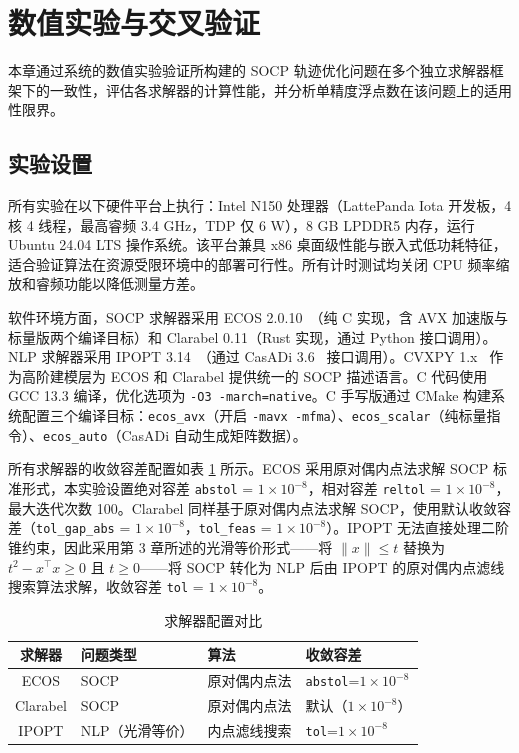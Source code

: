 \section{数值实验与交叉验证}

本章通过系统的数值实验验证所构建的 SOCP 轨迹优化问题在多个独立求解器框架下的一致性，评估各求解器的计算性能，并分析单精度浮点数在该问题上的适用性限界。

\subsection{实验设置}

所有实验在以下硬件平台上执行：Intel N150 处理器（LattePanda Iota 开发板，4 核 4 线程，最高睿频 3.4 GHz，TDP 仅 6 W），8 GB LPDDR5 内存，运行 Ubuntu 24.04 LTS 操作系统。该平台兼具 x86 桌面级性能与嵌入式低功耗特征，适合验证算法在资源受限环境中的部署可行性。所有计时测试均关闭 CPU 频率缩放和睿频功能以降低测量方差。

软件环境方面，SOCP 求解器采用 ECOS 2.0.10~\cite{domahidi2013ecos}（纯 C 实现，含 AVX 加速版与标量版两个编译目标）和 Clarabel 0.11（Rust 实现，通过 Python 接口调用）。NLP 求解器采用 IPOPT 3.14~\cite{wachter2006implementation}（通过 CasADi 3.6~\cite{andersson2019casadi} 接口调用）。CVXPY 1.x~\cite{diamond2016cvxpy} 作为高阶建模层为 ECOS 和 Clarabel 提供统一的 SOCP 描述语言。C 代码使用 GCC 13.3 编译，优化选项为 \texttt{-O3 -march=native}。C 手写版通过 CMake 构建系统配置三个编译目标：\texttt{ecos\_avx}（开启 \texttt{-mavx -mfma}）、\texttt{ecos\_scalar}（纯标量指令）、\texttt{ecos\_auto}（CasADi 自动生成矩阵数据）。

所有求解器的收敛容差配置如表 \ref{tab:solver_config} 所示。ECOS 采用原对偶内点法求解 SOCP 标准形式，本实验设置绝对容差 \texttt{abstol} = $1\times10^{-8}$，相对容差 \texttt{reltol} = $1\times10^{-8}$，最大迭代次数 100。Clarabel 同样基于原对偶内点法求解 SOCP，使用默认收敛容差（\texttt{tol\_gap\_abs} = $1\times10^{-8}$，\texttt{tol\_feas} = $1\times10^{-8}$）。IPOPT 无法直接处理二阶锥约束，因此采用第 3 章所述的光滑等价形式——将 $\|x\|\leq t$ 替换为 $t^2 - x^\top x \geq 0$ 且 $t \geq 0$——将 SOCP 转化为 NLP 后由 IPOPT 的原对偶内点滤线搜索算法求解，收敛容差 \texttt{tol} = $1\times10^{-8}$。

\begin{table}[tbp]
\centering
\caption{求解器配置对比}
\label{tab:solver_config}
\begin{tabular}{clll}
\toprule
求解器 & 问题类型 & 算法 & 收敛容差 \\
\midrule
ECOS       & SOCP & 原对偶内点法 & \texttt{abstol}=$1\times10^{-8}$ \\
Clarabel   & SOCP & 原对偶内点法 & 默认（$1\times10^{-8}$） \\
IPOPT      & NLP（光滑等价） & 内点滤线搜索 & \texttt{tol}=$1\times10^{-8}$ \\
\bottomrule
\end{tabular}
\end{table}

